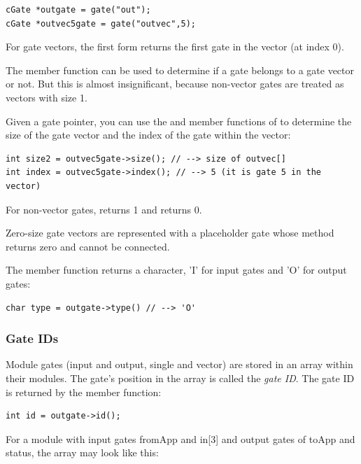\begin{verbatim}
cGate *outgate = gate("out");
cGate *outvec5gate = gate("outvec",5);
\end{verbatim}

For gate vectors, the first form returns the first gate in the
vector (at index 0).

The  member function can be used to determine if a
gate belongs to a gate vector or not. But this is almost insignificant,
because non-vector gates are treated as vectors with size 1.

Given a gate pointer, you can use the  and
 member functions of  to determine the
size of the gate vector and the
index of the gate within the vector:

\begin{verbatim}
int size2 = outvec5gate->size(); // --> size of outvec[]
int index = outvec5gate->index(); // --> 5 (it is gate 5 in the vector)
\end{verbatim}

For non-vector gates,  returns 1 and  returns 0.

Zero-size gate vectors are represented with a placeholder gate whose
 method returns zero and cannot be connected.

The  member function returns a character, 'I' for input
gates and 'O' for output gates:

\begin{verbatim}
char type = outgate->type() // --> 'O'
\end{verbatim}


\subsubsection{Gate IDs}

Module gates (input and output, single and vector) are stored in an
array within their modules. The gate's position in the array is called
the \textit{gate ID}. The gate ID is returned by the 
member function:

\begin{verbatim}
int id = outgate->id();
\end{verbatim}

For a module with input gates fromApp and in[3] and output gates
of toApp and status, the array may look like this:


